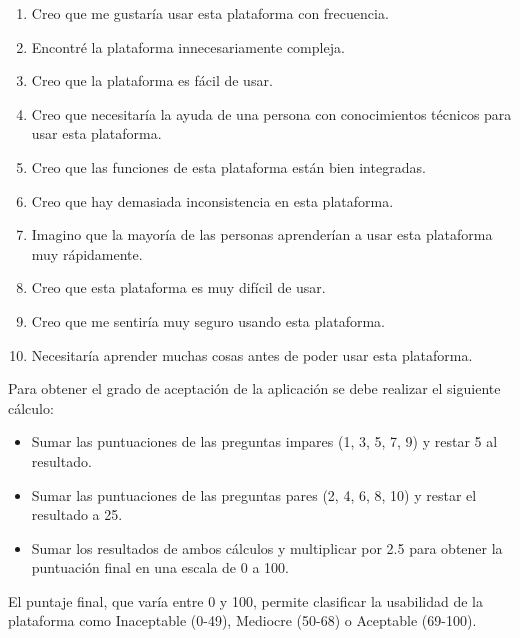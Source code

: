 \vspace{\parskip}
\begin{enumerate}
  \item Creo que me gustaría usar esta plataforma con frecuencia.\\
  \item Encontré la plataforma innecesariamente compleja.\\
  \item Creo que la plataforma es fácil de usar.\\
  \item Creo que necesitaría la ayuda de una persona con conocimientos técnicos para usar esta plataforma.\\
  \item Creo que las funciones de esta plataforma están bien integradas.\\
  \item Creo que hay demasiada inconsistencia en esta plataforma.\\
  \item Imagino que la mayoría de las personas aprenderían a usar esta plataforma muy rápidamente.\\
  \item Creo que esta plataforma es muy difícil de usar.\\
  \item Creo que me sentiría muy seguro usando esta plataforma.\\
  \item Necesitaría aprender muchas cosas antes de poder usar esta plataforma.\\
\end{enumerate}
\vspace{\parskip}

Para obtener el grado de aceptación de la aplicación se debe realizar el siguiente cálculo:

\begin{itemize}
  \item Sumar las puntuaciones de las preguntas impares (1, 3, 5, 7, 9) y restar 5 al resultado.
  \item Sumar las puntuaciones de las preguntas pares (2, 4, 6, 8, 10) y restar el resultado a 25.
  \item Sumar los resultados de ambos cálculos y multiplicar por 2.5 para obtener la puntuación final en una escala de 0 a 100.
\end{itemize}
\vspace{\parskip}

El puntaje final, que varía entre 0 y 100, permite clasificar la usabilidad de la plataforma como Inaceptable (0-49), Mediocre (50-68) o Aceptable (69-100).

